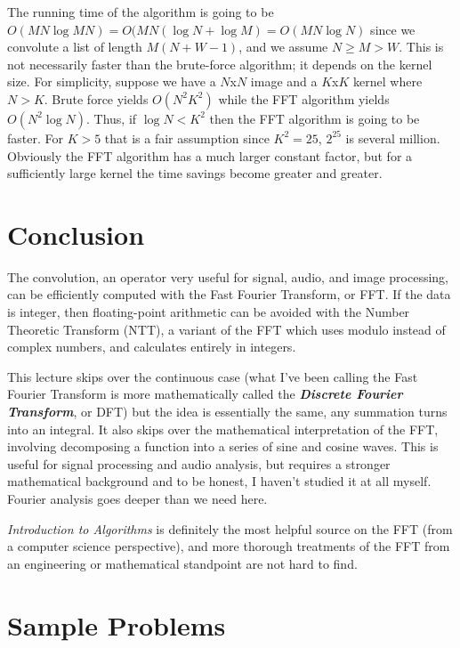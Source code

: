 \documentclass[11pt, oneside]{article}
\newcommand{\emphasis}[1]{\textbf{\textit{#1}}}
\theoremstyle{plain}
\theoremstyle{definition}
\begin{document}
The running time of the algorithm is going to be
\( O(MN \log MN) = O(MN(\log N + \log M) = O(MN \log N) \) since we convolute 
a list of length \( M(N + W - 1) \), and we assume \( N \geq M > W \).
This is not necessarily faster than the brute-force algorithm;
it depends on the kernel size. For simplicity, suppose we have a \( N \)x\( N \)
image and a \( K \)x\( K \) kernel where \( N > K \). Brute force yields
\( O(N^2 K^2) \) while the FFT algorithm yields \( O(N^2 \log N) \).
Thus, if \( \log N < K^2 \) then the FFT algorithm is going to be faster.
For \( K > 5 \) that is a fair assumption since \( K^2 = 25 \), \( 2^{25} \)
is several million. Obviously the FFT algorithm has a much larger constant
factor, but for a sufficiently large kernel the time savings become greater
and greater.

\section{Conclusion}

The convolution, an operator very useful for signal, audio, and image
processing, can be efficiently computed with the Fast Fourier Transform, or FFT.
If the data is integer, then floating-point arithmetic can be avoided with the
Number Theoretic Transform (NTT), a variant of the FFT which uses modulo
instead of complex numbers, and calculates entirely in integers.

This lecture skips over the continuous case (what I've been calling the 
Fast Fourier Transform is more mathematically called the
\emphasis{Discrete Fourier Transform}, or DFT) but the idea is essentially the
same, any summation turns into an integral. It also skips over the mathematical
interpretation of the FFT, involving decomposing a function into a series of
sine and cosine waves. This is useful for signal processing and audio analysis,
but requires a stronger mathematical background and to be honest, I haven't
studied it at all myself. Fourier analysis goes deeper than we need here. 

\textit{Introduction to Algorithms} is definitely the most helpful source on
the FFT (from a computer science perspective), and more thorough treatments of
the FFT from an engineering or mathematical standpoint are not hard to find.

\newpage

\section{Sample Problems}
\end{document}
